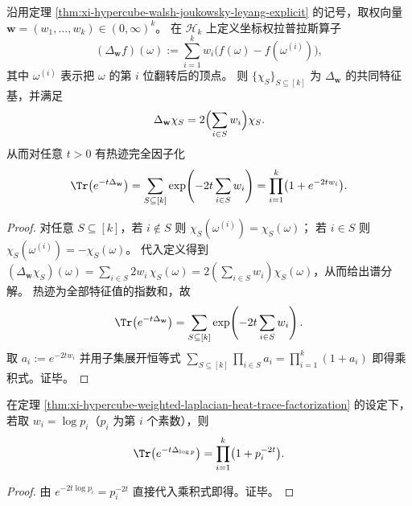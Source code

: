 \begin{theorem}\label{thm:xi-hypercube-weighted-laplacian-heat-trace-factorization}
沿用定理 \ref{thm:xi-hypercube-walsh-joukowsky-leyang-explicit} 的记号，取权向量 \(\mathbf w=(w_1,\dots,w_k)\in(0,\infty)^k\)。
在 \(\mathcal H_k\) 上定义坐标权拉普拉斯算子
\[
(\Delta_{\mathbf w}f)(\omega):=\sum_{i=1}^{k}w_i\bigl(f(\omega)-f(\omega^{(i)})\bigr),
\]
其中 \(\omega^{(i)}\) 表示把 \(\omega\) 的第 \(i\) 位翻转后的顶点。
则 \(\{\chi_S\}_{S\subseteq[k]}\) 为 \(\Delta_{\mathbf w}\) 的共同特征基，并满足
\[
\Delta_{\mathbf w}\chi_S=2\Bigl(\sum_{i\in S}w_i\Bigr)\chi_S.
\]
从而对任意 \(t>0\) 有热迹完全因子化
\[
\Tr\bigl(e^{-t\Delta_{\mathbf w}}\bigr)
=\sum_{S\subseteq[k]}\exp\!\left(-2t\sum_{i\in S}w_i\right)
=\prod_{i=1}^{k}\bigl(1+e^{-2tw_i}\bigr).
\]
\end{theorem}
\begin{proof}
对任意 \(S\subseteq[k]\)，若 \(i\notin S\) 则 \(\chi_S(\omega^{(i)})=\chi_S(\omega)\)；
若 \(i\in S\) 则 \(\chi_S(\omega^{(i)})=-\chi_S(\omega)\)。
代入定义得到
\(
(\Delta_{\mathbf w}\chi_S)(\omega)=\sum_{i\in S}2w_i\,\chi_S(\omega)
=2(\sum_{i\in S}w_i)\chi_S(\omega)
\)，从而给出谱分解。
热迹为全部特征值的指数和，故
\[
\Tr\bigl(e^{-t\Delta_{\mathbf w}}\bigr)
=\sum_{S\subseteq[k]}\exp\!\left(-2t\sum_{i\in S}w_i\right).
\]
取 \(a_i:=e^{-2tw_i}\) 并用子集展开恒等式
\(
\sum_{S\subseteq[k]}\prod_{i\in S}a_i=\prod_{i=1}^k(1+a_i)
\)
即得乘积式。证毕。
\end{proof}

\begin{corollary}[素数对数权的欧拉型热迹]\label{cor:xi-prime-log-weighted-hypercube-heat-trace-euler}
在定理 \ref{thm:xi-hypercube-weighted-laplacian-heat-trace-factorization} 的设定下，若取 \(w_i=\log p_i\)（\(p_i\) 为第 \(i\) 个素数），则
\[
\Tr\bigl(e^{-t\Delta_{\log p}}\bigr)=\prod_{i=1}^{k}\bigl(1+p_i^{-2t}\bigr).
\]
\end{corollary}
\begin{proof}
由 \(e^{-2t\log p_i}=p_i^{-2t}\) 直接代入乘积式即得。证毕。
\end{proof}

